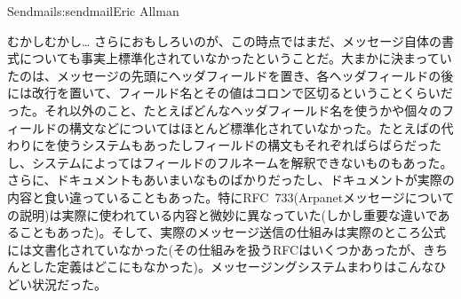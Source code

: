 \begin{aosachapter}{Sendmail}{s:sendmail}{Eric Allman}
\begin{aosasect1}{むかしむかし\ldots}
さらにおもしろいのが、この時点ではまだ、メッセージ自体の書式についても事実上標準化されていなかったということだ。大まかに決まっていたのは、メッセージの先頭にヘッダフィールドを置き、各ヘッダフィールドの後には改行を置いて、フィールド名とその値はコロンで区切るということくらいだった。それ以外のこと、たとえばどんなヘッダフィールド名を使うかや個々のフィールドの構文などについてはほとんど標準化されていなかった。たとえばの代わりにを使うシステムもあったしフィールドの構文もそれぞればらばらだったし、システムによってはフィールドのフルネームを解釈できないものもあった。さらに、ドキュメントもあいまいなものばかりだったし、ドキュメントが実際の内容と食い違っていることもあった。特にRFC~733(Arpanetメッセージについての説明)は実際に使われている内容と微妙に異なっていた(しかし重要な違いであることもあった)。そして、実際のメッセージ送信の仕組みは実際のところ公式には文書化されていなかった(その仕組みを扱うRFCはいくつかあったが、きちんとした定義はどこにもなかった)。メッセージングシステムまわりはこんなひどい状況だった。


\end{aosasect1}
\end{aosachapter}
